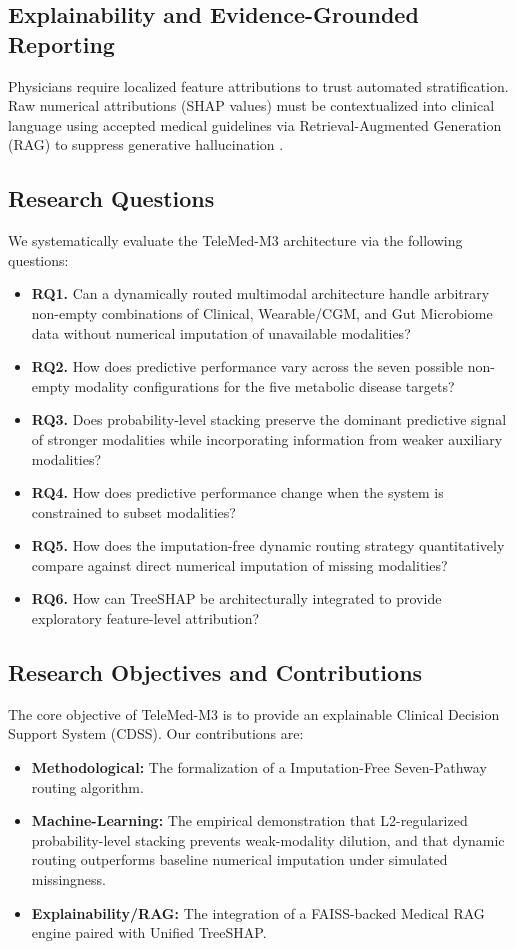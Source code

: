 \documentclass[journal, twocolumn]{IEEEtran}
\begin{document}
\subsection{Explainability and Evidence-Grounded Reporting}
Physicians require localized feature attributions to trust automated stratification. Raw numerical attributions (SHAP values) must be contextualized into clinical language using accepted medical guidelines via Retrieval-Augmented Generation (RAG) to suppress generative hallucination \cite{lewis2020rag, lundberg2020local}.

\subsection{Research Questions}
We systematically evaluate the TeleMed-M3 architecture via the following questions:
\begin{itemize}
\item \textbf{RQ1.} Can a dynamically routed multimodal architecture handle arbitrary non-empty combinations of Clinical, Wearable/CGM, and Gut Microbiome data without numerical imputation of unavailable modalities?
\item \textbf{RQ2.} How does predictive performance vary across the seven possible non-empty modality configurations for the five metabolic disease targets?
\item \textbf{RQ3.} Does probability-level stacking preserve the dominant predictive signal of stronger modalities while incorporating information from weaker auxiliary modalities?
\item \textbf{RQ4.} How does predictive performance change when the system is constrained to subset modalities?
\item \textbf{RQ5.} How does the imputation-free dynamic routing strategy quantitatively compare against direct numerical imputation of missing modalities?
\item \textbf{RQ6.} How can TreeSHAP be architecturally integrated to provide exploratory feature-level attribution?
\end{itemize}

\subsection{Research Objectives and Contributions}
The core objective of TeleMed-M3 is to provide an explainable Clinical Decision Support System (CDSS). Our contributions are:
\begin{itemize}
\item \textbf{Methodological:} The formalization of a Imputation-Free Seven-Pathway routing algorithm.
\item \textbf{Machine-Learning:} The empirical demonstration that L2-regularized probability-level stacking prevents weak-modality dilution, and that dynamic routing outperforms baseline numerical imputation under simulated missingness.
\item \textbf{Explainability/RAG:} The integration of a FAISS-backed Medical RAG engine paired with Unified TreeSHAP.
\end{itemize}
\end{document}
